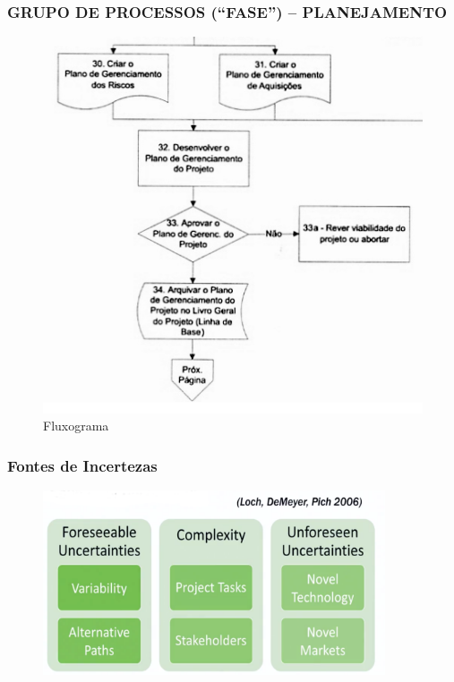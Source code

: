 \begin{frame}
 \frametitle{GRUPO DE PROCESSOS (“FASE”) – PLANEJAMENTO}
  \begin{figure}
   \centering
   \includegraphics[height = .9\textheight]{figs/fig17.png}
   \caption{Fluxograma}
  \end{figure}
\end{frame}

\begin{frame}
 \frametitle{Fontes de Incertezas}
  \begin{figure}
   \centering
   \includegraphics[width = 0.9\textwidth]{figs/fig1.png}
  \end{figure}
\end{frame}


